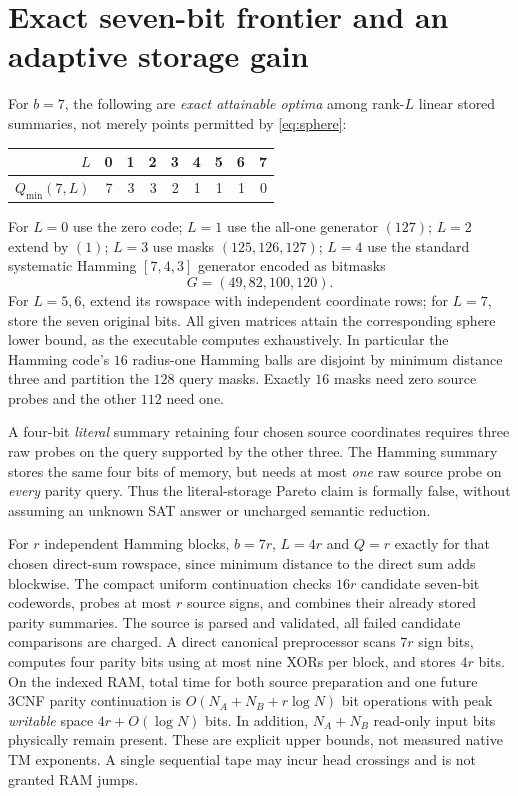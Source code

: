 \documentclass[10pt]{article}
\begin{document}
\section{Exact seven-bit frontier and an adaptive storage gain}
For $b=7$, the following are \emph{exact attainable optima} among rank-$L$ linear stored summaries, not merely points permitted by \eqref{eq:sphere}:
\begin{center}
\begin{tabular}{rrrrrrrrr}\toprule
$L$&0&1&2&3&4&5&6&7\\\midrule
$Q_{\min}(7,L)$&7&3&3&2&1&1&1&0\\\bottomrule
\end{tabular}
\end{center}
For $L=0$ use the zero code; $L=1$ use the all-one generator $(127)$; $L=2$ extend by $(1)$; $L=3$ use masks $(125,126,127)$; $L=4$ use the standard systematic Hamming $[7,4,3]$ generator encoded as bitmasks
\[
 G=(49,82,100,120).
\]
For $L=5,6$, extend its rowspace with independent coordinate rows; for $L=7$, store the seven original bits. All given matrices attain the corresponding sphere lower bound, as the executable computes exhaustively. In particular the Hamming code's $16$ radius-one Hamming balls are disjoint by minimum distance three and partition the $128$ query masks. Exactly $16$ masks need zero source probes and the other $112$ need one.

\noindent A four-bit \emph{literal} summary retaining four chosen source coordinates requires three raw probes on the query supported by the other three. The Hamming summary stores the same four bits of memory, but needs at most \emph{one} raw source probe on \emph{every} parity query. Thus the literal-storage Pareto claim is formally false, without assuming an unknown SAT answer or uncharged semantic reduction.

\noindent For $r$ independent Hamming blocks, $b=7r$, $L=4r$ and $Q=r$ exactly for that chosen direct-sum rowspace, since minimum distance to the direct sum adds blockwise. The compact uniform continuation checks $16r$ candidate seven-bit codewords, probes at most $r$ source signs, and combines their already stored parity summaries. The source is parsed and validated, all failed candidate comparisons are charged. A direct canonical preprocessor scans $7r$ sign bits, computes four parity bits using at most nine XORs per block, and stores $4r$ bits. On the indexed RAM, total time for both source preparation and one future 3CNF parity continuation is $O(N_A+N_B+r\log N)$ bit operations with peak \emph{writable} space $4r+O(\log N)$ bits. In addition, $N_A+N_B$ read-only input bits physically remain present. These are explicit upper bounds, not measured native TM exponents. A single sequential tape may incur head crossings and is not granted RAM jumps.
\end{document}
